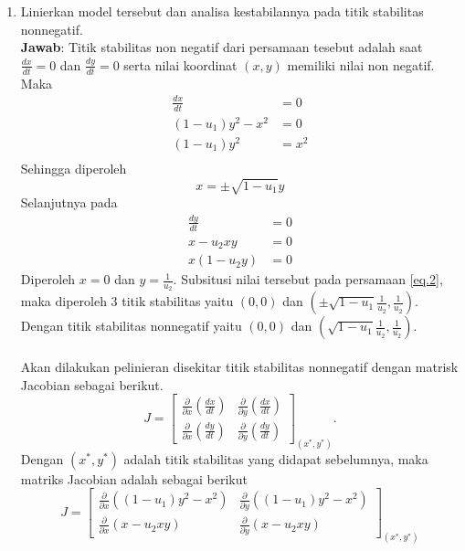 \documentclass{article}
\begin{document}
\begin{enumerate}[label=\alph*.]
    \item Linierkan model tersebut dan analisa kestabilannya pada titik stabilitas nonnegatif.\\
    \textbf{Jawab}: Titik stabilitas non negatif dari persamaan tesebut adalah saat $\frac{dx}{dt} = 0$ dan $\frac{dy}{dt} = 0$ serta nilai koordinat $(x,y)$ memiliki nilai non negatif. Maka
    \begin{align*}
        \frac{dx}{dt} &=0 \\
        (1-u_1)y^2-x^2 &=0 \\
        (1-u_1)y^2 &=x^2 \\
    \end{align*}
    Sehingga diperoleh
    \begin{equation}
        x=\pm \sqrt{1-u_1}y \label{eq.2}
    \end{equation}
    Selanjutnya pada
    \begin{align*}
        \frac{dy}{dt} &=0 \\
        x-u_2xy &=0 \\
        x(1-u_2y) &=0
    \end{align*}
    Diperoleh $x=0$ dan $y=\frac{1}{u_2}$. Subsitusi nilai tersebut pada persamaan \eqref{eq.2}, maka diperoleh 3 titik stabilitas yaitu $(0,0)$ dan $(\pm\sqrt{1-u_1}\frac{1}{u_2},\frac{1}{u_2})$. Dengan titik stabilitas nonnegatif yaitu $(0,0)$ dan $(\sqrt{1-u_1}\frac{1}{u_2},\frac{1}{u_2})$. \\ 
    \\
    Akan dilakukan pelinieran disekitar titik stabilitas nonnegatif dengan matrisk Jacobian sebagai berikut. 
    \[
    J = 
    \begin{bmatrix}
    \frac{\partial}{\partial x}\left( \frac{dx}{dt} \right) & \frac{\partial}{\partial y}\left( \frac{dx}{dt} \right) \\
    \frac{\partial}{\partial x}\left( \frac{dy}{dt} \right) & \frac{\partial}{\partial y}\left( \frac{dy}{dt} \right)
    \end{bmatrix}_{(x^*,y^*)}.
    \]
    Dengan $(x^*,y^*)$ adalah titik stabilitas yang didapat sebelumnya, maka matriks Jacobian adalah sebagai berikut
    \[
    J = 
    \begin{bmatrix}
    \frac{\partial}{\partial x}\left( (1-u_1)y^2-x^2 \right) & \frac{\partial}{\partial y}\left( (1-u_1)y^2-x^2 \right) \\
    \frac{\partial}{\partial x}\left( x-u_2xy \right) & \frac{\partial}{\partial y}\left( x-u_2xy \right)
    \end{bmatrix}_{(x^*,y^*)}
\]
\end{enumerate}
\end{document}
